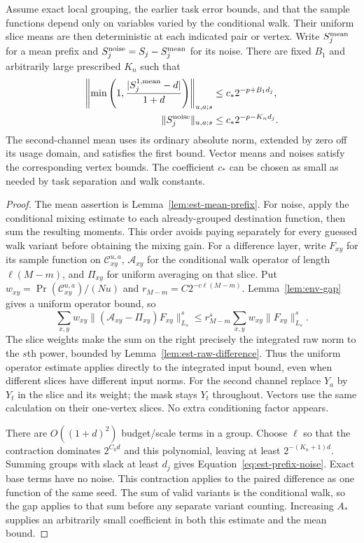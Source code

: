 \begin{lemma}\label{lem:est-prefix}
Assume exact local grouping, the earlier task error bounds, and that the
sample functions depend only on variables varied by the conditional walk.
Their uniform slice means are then deterministic at each indicated pair
or vertex.  Write $S_j^{\rm mean}$ for a mean prefix and
$S_j^{\rm noise}=S_j-S_j^{\rm mean}$ for its noise.  There are fixed
$B_1$ and arbitrarily large prescribed $K_n$ such that
\begin{align}
 \left\|\min\left(1,
       \frac{|S_j^{1,\rm mean}-d|}{1+d}\right)\right\|_{u,a;s}
       &\le c_*2^{-p+B_1d_j},
       \label{eq:est-prefix-mean}\\
 \|S_j^{\rm noise}\|_{u,a;s}
       &\le c_*2^{-p-K_nd_j}.
       \label{eq:est-prefix-noise}
\end{align}
The second-channel mean uses its ordinary absolute norm, extended by zero
off its usage domain, and satisfies the first bound.  Vector means and
noises satisfy the corresponding vertex bounds.  The coefficient $c_*$
can be chosen as small as needed by task separation and walk constants.
\end{lemma}
\begin{proof}
The mean assertion is Lemma~\ref{lem:est-mean-prefix}. For noise, apply the conditional mixing estimate to each already-grouped destination function, then sum the resulting moments. This order avoids paying separately for every guessed walk variant before obtaining the mixing gain.
For a difference layer, write $F_{xy}$ for its sample function on
$\mathcal C_{xy}^{u,a}$, $\mathcal A_{xy}$ for the conditional walk
operator of length $\ell(M-m)$, and $\Pi_{xy}$ for uniform averaging
on that slice.  Put
$w_{xy}=\Pr(\mathcal C_{xy}^{u,a})/(Nu)$ and
$r_{M-m}=C2^{-c\ell(M-m)}$.
Lemma~\ref{lem:env-gap} gives a uniform operator bound, so
\[
 \sum_{x,y}w_{xy}
   \|(\mathcal A_{xy}-\Pi_{xy})F_{xy}\|_{L_s}^s
 \le r_{M-m}^s
   \sum_{x,y}w_{xy}\|F_{xy}\|_{L_s}^s.
\]
The slice weights make the sum on the right precisely the integrated raw
norm to the $s$th power, bounded by Lemma~\ref{lem:est-raw-difference}.
Thus the uniform operator estimate applies directly to the integrated
input bound, even when different slices have different input norms.
For the second channel replace $Y_a$ by $Y_t$ in the slice and its
weight; the mask stays $Y_t$ throughout.  Vectors use the same
calculation on their one-vertex slices.  No extra conditioning factor
appears.

There are $O((1+d)^2)$ budget/scale terms in a group.  Choose $\ell$ so
that the contraction dominates $2^{C_0d}$ and this polynomial, leaving
at least $2^{-(K_n+1)d}$.  Summing groups with slack at least $d_j$ gives
Equation~\eqref{eq:est-prefix-noise}.  Exact base terms have no noise.
This contraction applies to the paired difference as one function of the
same seed.  The sum of valid variants is the conditional walk, so the
gap applies to that sum before any separate variant counting.
Increasing $A_*$ supplies an
arbitrarily small coefficient in both this estimate and the mean bound.
\end{proof}

